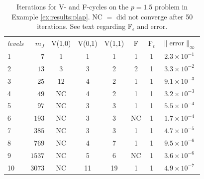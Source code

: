 \documentclass[letterpaper,final,12pt,reqno]{amsart}
\theoremstyle{cstyle}
\theoremstyle{cstyle*}
\theoremstyle{dstyle}
\numberwithin{equation}{section}
\numberwithin{figure}{section}
\numberwithin{table}{section}
\numberwithin{theorem}{section}
\newcommand{\eps}{\epsilon}
\begin{document}

\begin{table}[ht]
\begin{tabular}{lr@{\hskip 7mm}c@{\hskip 3mm}c@{\hskip 3mm}c@{\hskip 4mm}c@{\hskip 5mm}c@{\hskip 6mm}c}
\emph{levels} & $m_J$ & V(1,0) & V(0,1) & V(1,1) & F & F$_\eps$ & $\|$error$\|_\infty$ \\ \cmidrule{1-8}
 1 &    $7$ &  1 &  1 &  1 &  1 &  1 & $2.3\times 10^{-1}$ \\
 2 &   $13$ &  3 &  3 &  2 &  2 &  1 & $3.3 \times 10^{-2}$ \\
 3 &   $25$ & 12 &  4 &  2 &  1 &  1 & $9.1 \times 10^{-3}$ \\
 4 &   $49$ & NC &  4 &  2 &  1 &  1 & $3.2 \times 10^{-3}$ \\
 5 &   $97$ & NC &  3 &  3 &  1 &  1 & $5.5 \times 10^{-4}$ \\
 6 &  $193$ & NC &  3 &  3 & NC &  1 & $1.7 \times 10^{-4}$ \\
 7 &  $385$ & NC &  3 &  3 &  1 &  1 & $4.7 \times 10^{-5}$ \\
 8 &  $769$ & NC &  4 &  7 &  1 &  1 & $9.5 \times 10^{-6}$ \\
 9 & $1537$ & NC &  5 &  6 & NC &  1 & $3.6 \times 10^{-6}$ \\
10 & $3073$ & NC & 11 & 19 &  1 &  1 & $4.9 \times 10^{-7}$
\end{tabular}
\bigskip
\caption{Iterations for V- and F-cycles on the $p=1.5$ problem in Example \ref{ex:results:plap}.  NC $=$ did not converge after 50 iterations.  See text regarding F$_\eps$ and error.}
\label{tab:results:fastplap1d}
\end{table}
\end{document}
